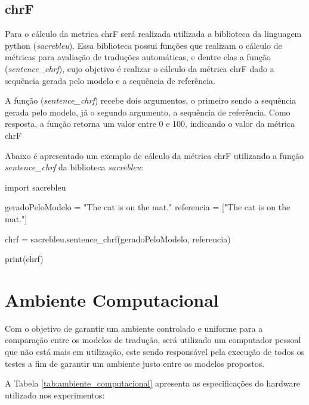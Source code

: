 \subsection{chrF}

Para o cálculo da metrica chrF será realizada utilizada a biblioteca da linguagem python (\textit{sacrebleu}). Essa biblioteca possui funções que realizam o cálculo de métricas para avaliação de traduções automáticas, e dentre elas a função (\textit{sentence\_chrf}), cujo objetivo é realizar o cálculo da métrica chrF dado a sequência gerada pelo modelo e a sequência de referência.


A função (\textit{sentence\_chrf}) recebe dois argumentos, o primeiro sendo a sequência gerada pelo modelo, já o segundo argumento, a sequência de referência. Como resposta, a função retorna um valor entre 0 e 100, indicando o valor da métrica chrF

Abaixo é apresentado um exemplo de cálculo da métrica chrF utilizando a função \textit{sentence\_chrf} da biblioteca \textit{sacrebleu}:
\\
\begin{listing}
\begin{python}
import sacrebleu

geradoPeloModelo = "The cat is on the mat."
referencia = ["The cat is on the mat."]

chrf = sacrebleu.sentence_chrf(geradoPeloModelo, referencia)

print(chrf)

\end{python}
\caption{Exemplo de cálculo da métrica chrF com a biblioteca sacrebleu}
\label{code:bleu_example}
\end{listing}

\section{Ambiente Computacional}

Com o objetivo de garantir um ambiente controlado e uniforme para a comparação entre os modelos de tradução, será utilizado um computador pessoal que não está mais em utilização, este sendo responsável pela execução de todos os testes a fim de garantir um ambiente justo entre os modelos propostos.

A Tabela \ref{tab:ambiente_computacional} apresenta as especificações do hardware utilizado nos experimentos:

